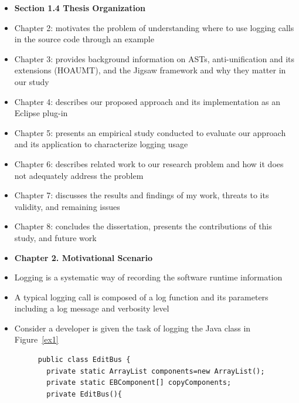 \documentclass{article}
\newcommand{\bold}{\textbf}
\begin{document}
\begin{itemize} [leftmargin=.1in]
\item \bold{Section 1.4 Thesis Organization}
\item Chapter 2: motivates the problem of understanding where to use logging calls in the source code through an example
\item Chapter 3: provides background information on ASTs, anti-unification and its extensions (HOAUMT), and the Jigsaw framework and why they matter in our study  
\item Chapter 4: describes our proposed approach and its implementation as an Eclipse plug-in
\item Chapter 5: presents an empirical study conducted to evaluate our approach and its application to characterize logging usage
\item Chapter 6: describes related work to our research problem and how it
does not adequately address the problem
\item Chapter 7: discusses the results and findings of my work, threats to its validity, and remaining issues
\item Chapter 8: concludes the dissertation, presents the contributions of this study, and future work

\item \bold{Chapter 2. Motivational Scenario}
\item Logging is a systematic way of recording the software runtime information
\item A typical logging call is composed of a log function and its parameters including a log message and verbosity level
\item Consider a developer is given the task of logging the Java class in Figure~\ref{ex1}
\begin{figure}[H]
\def\baselinestretch{1}
\begin{lstlisting}
public class EditBus {
  private static ArrayList components=new ArrayList();
  private static EBComponent[] copyComponents;
  private EditBus(){
  

\end{lstlisting}
\end{figure}
\end{itemize}
\end{document}
